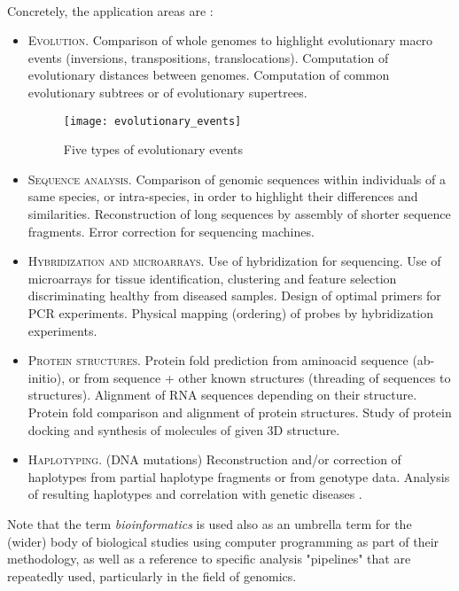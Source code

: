 \paragraph{}
Concretely, the application areas are \cite{a1020100}:
\begin{itemize}
	\item \textsc{Evolution.} Comparison of whole genomes to highlight evolutionary macro events (inversions, transpositions, translocations). Computation of evolutionary distances between genomes. Computation of common evolutionary subtrees or of evolutionary supertrees.
		\begin{figure}[h]
  \centering
    \texttt{[image: evolutionary\_events]}
  \caption{Five types of evolutionary events}
\end{figure}
	\item \textsc{Sequence analysis.} Comparison of genomic sequences within individuals of a same species, or intra-species, in order to highlight their differences and similarities. Reconstruction of long sequences by assembly of shorter sequence fragments. Error correction for sequencing machines.
	\item \textsc{Hybridization and microarrays.} Use of hybridization for sequencing. Use of microarrays for tissue identification, clustering and feature selection discriminating healthy from diseased samples. Design of optimal primers for PCR experiments. Physical mapping (ordering) of probes by hybridization experiments.
	\item \textsc{Protein structures.} Protein fold prediction from aminoacid sequence (ab-initio), or from sequence + other known structures (threading of sequences to structures). Alignment of RNA sequences depending on their structure. Protein fold comparison and alignment of protein structures. Study of protein docking and synthesis of molecules of given 3D structure.
	\item \textsc{Haplotyping.} (DNA mutations) Reconstruction and/or correction of haplotypes from partial haplotype fragments or from genotype data. Analysis of resulting haplotypes and correlation with genetic diseases \cite{Bonizzoni2003}.

\end{itemize}



Note that the term \textit{bioinformatics} is used also as an umbrella term for the (wider) body of biological studies using computer programming as part of their methodology, as well as a reference to specific analysis "pipelines" that are repeatedly used, particularly in the field of genomics.
